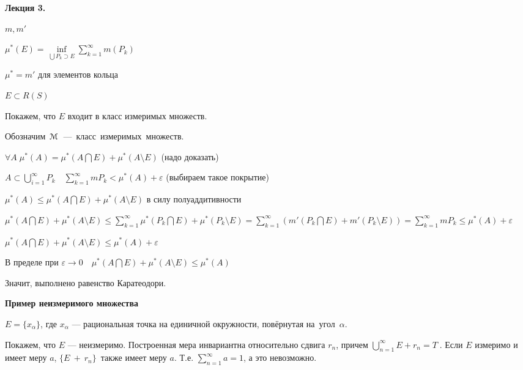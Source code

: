 

\begin{center}
\textbf{Лекция 3.}
\end{center}

$m, m'$

$\mu^* (E) = \inf\limits_{\bigcup P_k \supset E}
\sum_{k=1}^{\infty} m(P_k)$

$\mu^* = m' \mbox{ для элементов кольца}$

$E \subset R(S)$

Покажем, что $E$ входит в класс измеримых множеств.

Обозначим~$\EuScript{M}$~---~класс~измеримых~множеств.

$\forall A \; \mu^*(A) = \mu^*(A \bigcap E) + \mu^*(A \setminus
E)$ (надо доказать)

$A \subset \bigcup_{i=1}^{\infty} P_k \quad \sum_{k=1}^{\infty}
mP_k < \mu^*(A) + \varepsilon$ (выбираем такое покрытие)

$\mu^*(A) \leqslant \mu^*(A \bigcap E) + \mu^*(A \setminus E)$ в
силу полуаддитивности

$\mu^*(A \bigcap E) + \mu^*(A \setminus E) \leqslant
\sum_{k=1}^{\infty} \mu^*(P_k \bigcap E) + \mu^*(P_k \setminus E)
=  \sum_{k=1}^{\infty} (m'(P_k \bigcap E) + m'(P_k \setminus E)) =
\sum_{k=1}^{\infty} mP_k \leqslant \mu^*(A) + \varepsilon$

$\mu^*(A \bigcap E) + \mu^*(A \setminus E) \leqslant \mu^*(A) +
\varepsilon$

В пределе при $\varepsilon \rightarrow 0 \quad \mu^*(A \bigcap E)
+ \mu^*(A \setminus E) \leqslant \mu^*(A)$

Значит, выполнено равенство Каратеодори.

\textbf{Пример неизмеримого множества}

$E = \{x_\alpha\}$, где $x_\alpha$ --- рациональная точка на
единичной окружности, повёрнутая на~угол~$\alpha$.

Покажем, что $E$ --- неизмеримо. Построенная мера инвариантна
относительно сдвига $r_n$, причем $\bigcup_{n=1}^{\infty}{E + r_n}
= T\;$.  Если $E$ измеримо и имеет меру $a$, $\{E~+~r_n\}$~также
имеет меру $a$. Т.е. $\sum_{n=1}^{\infty} a = 1$, а это
невозможно.

